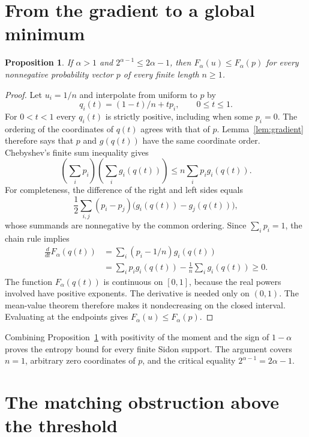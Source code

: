 \documentclass[11pt,a4paper]{article}
\newtheorem{proposition}[theorem]{Proposition}
\begin{document}
\section{From the gradient to a global minimum}

\begin{proposition}\label{prop:minimum}
If $\alpha>1$ and $2^{\alpha-1}\le2\alpha-1$, then
$F_\alpha(u)\le F_\alpha(p)$ for every nonnegative probability vector $p$
of every finite length $n\ge1$.
\end{proposition}

\begin{proof}
Let $u_i=1/n$ and interpolate from uniform to $p$ by
\[
q_i(t)=(1-t)/n+t p_i,\qquad 0\le t\le1.
\]
For $0<t<1$ every $q_i(t)$ is strictly positive, including when some $p_i=0$.
The ordering of the coordinates of $q(t)$ agrees with that of $p$.
Lemma~\ref{lem:gradient} therefore says that $p$ and $g(q(t))$ have the same
coordinate order. Chebyshev's finite sum inequality gives
\[
\left(\sum_i p_i\right)\left(\sum_i g_i(q(t))\right)
\le n\sum_i p_i g_i(q(t)).
\]
For completeness, the difference of the right and left sides equals
\[
\frac12\sum_{i,j}(p_i-p_j)\bigl(g_i(q(t))-g_j(q(t))\bigr),
\]
whose summands are nonnegative by the common ordering. Since $\sum_i p_i=1$,
the chain rule implies
\begin{align*}
\frac{d}{dt}F_\alpha(q(t))
&=\sum_i(p_i-1/n)g_i(q(t))\\
&=\sum_i p_i g_i(q(t))-
  \frac1n\sum_i g_i(q(t))\ge0.
\end{align*}
The function $F_\alpha(q(t))$ is continuous on $[0,1]$, because the real
powers involved have positive exponents. The derivative is needed only on
$(0,1)$. The mean-value theorem therefore makes it nondecreasing on the
closed interval. Evaluating at the endpoints gives
$F_\alpha(u)\le F_\alpha(p)$.
\end{proof}

Combining Proposition~\ref{prop:minimum} with positivity of the moment and
the sign of $1-\alpha$ proves the entropy bound for every finite Sidon
support. The argument covers $n=1$, arbitrary zero coordinates of $p$, and
the critical equality $2^{\alpha-1}=2\alpha-1$.

\section{The matching obstruction above the threshold}
\end{document}
